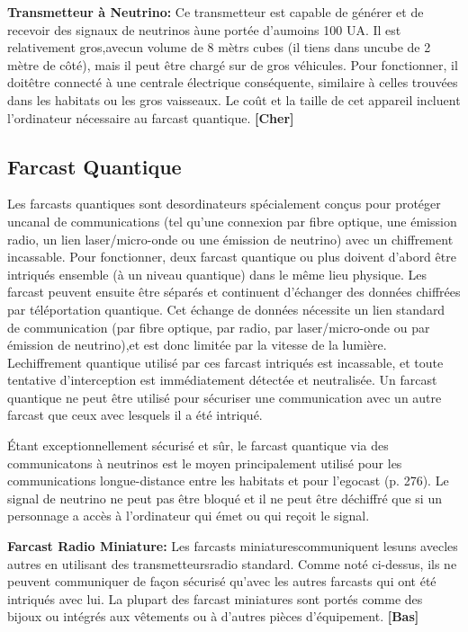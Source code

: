 \textbf{Transmetteur à Neutrino:} Ce transmetteur est capable de générer et de recevoir des signaux de neutrinos àune portée d'aumoins 100 UA. Il est relativement gros,avecun volume de 8 mètrs cubes (il tiens dans uncube de 2 mètre de côté), mais il peut être chargé sur de gros véhicules. Pour fonctionner, il doitêtre connecté à une centrale électrique conséquente, similaire à celles trouvées dans les habitats ou les gros vaisseaux. Le coût et la taille de cet appareil incluent l'ordinateur nécessaire au farcast quantique. \textbf{[Cher]} 

\subsection{Farcast Quantique} \label{sec:quantum-farcasters} 

Les farcasts quantiques sont desordinateurs spécialement conçus pour protéger uncanal de communications (tel qu'une connexion par fibre optique, une émission radio, un lien laser/micro-onde ou une émission de neutrino) avec un chiffrement incassable. Pour fonctionner, deux farcast quantique ou plus doivent d'abord être intriqués ensemble (à un niveau quantique) dans le même lieu physique. Les farcast peuvent ensuite être séparés et continuent d'échanger des données chiffrées par téléportation quantique. Cet échange de données nécessite un lien standard de communication (par fibre optique, par radio, par laser/micro-onde ou par émission de neutrino),et est donc limitée par la vitesse de la lumière. Lechiffrement quantique utilisé par ces farcast intriqués est incassable, et toute tentative d'interception est immédiatement détectée et neutralisée. Un farcast quantique ne peut être utilisé pour sécuriser une communication avec un autre farcast que ceux avec lesquels il a été intriqué. 

Étant exceptionnellement sécurisé et sûr, le farcast quantique via des communicatons à neutrinos est le moyen principalement utilisé pour les communications longue-distance entre les habitats et pour l'egocast (p. 276). Le signal de neutrino ne peut pas être bloqué et il ne peut être déchiffré que si un personnage a accès à l'ordinateur qui émet ou qui reçoit le signal. 

\textbf{Farcast Radio Miniature:} Les farcasts miniaturescommuniquent lesuns avecles autres en utilisant des transmetteursradio standard. Comme noté ci-dessus, ils ne peuvent communiquer de façon sécurisé qu'avec les autres farcasts qui ont été intriqués avec lui. La plupart des farcast miniatures sont portés comme des bijoux ou intégrés aux vêtements ou à d'autres pièces d'équipement.  \textbf{[Bas]} 

